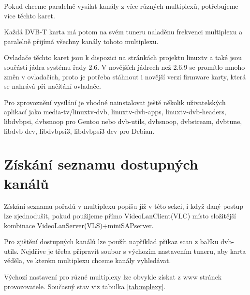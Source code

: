 Pokud chceme paralelně vysílat kanály z více různých multiplexů, potřebujeme více těchto karet.

Každá DVB-T karta má potom na svém tuneru naladěnu frekvenci multiplexu a paralelně přijímá všechny kanály tohoto multiplexu.

Ovladače těchto karet jsou k dispozici na stránkách projektu linuxtv \cite{linuxtvURL} a také jsou součástí jádra systému řady 2.6. V novějších jádrech než 2.6.9 se promítlo mnoho změn v ovladačích, proto je potřeba stáhnout i novější verzi firmware karty, která se nahrává při načítání ovladače.

Pro zprovoznění vysílání je vhodné nainstalovat ještě několik uživatelských aplikací jako media-tv/linuxtv-dvb, linuxtv-dvb-apps, linuxtv-dvb-headers, libdvbpsi, dvbsnoop pro Gentoo nebo dvb-utils, dvbsnoop, dvbstream, dvbtune, libdvb-dev, libdvbpsi3, libdvbpsi3-dev pro Debian.

\section{Získání seznamu dostupných kanálů}

Získání seznamu pořadů v multiplexu popíšu již v této sekci, i když daný postup lze zjednodušit, pokud použijeme přímo VideoLanClient(VLC) místo složitější kombinace VideoLanServer(VLS)+miniSAPserver.

Pro zjištění dostupných kanálů lze použít například příkaz scan z balíku dvb-utils. Nejdříve je třeba připravit soubor s výchozím nastavením tuneru, aby karta věděla, ve kterém multiplexu chceme kanály vyhledávat.

Výchozí nastavení pro různé multiplexy lze obvykle získat z www stránek provozovatele. Současný stav viz tabulka \ref{tab:mplexy}.

